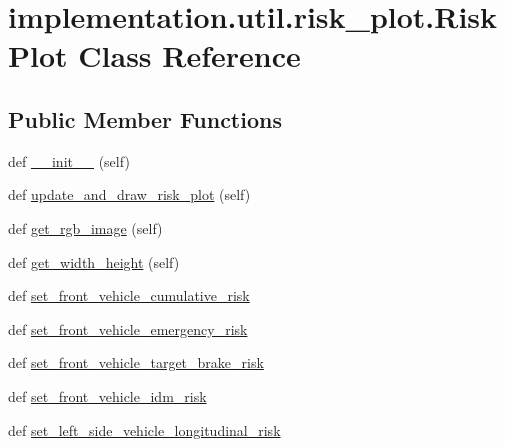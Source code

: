 \hypertarget{classimplementation_1_1util_1_1risk__plot_1_1_risk_plot}{}\section{implementation.\+util.\+risk\+\_\+plot.\+Risk\+Plot Class Reference}
\label{classimplementation_1_1util_1_1risk__plot_1_1_risk_plot}
\subsection*{Public Member Functions}
\begin{DoxyCompactItemize}
\item 
def \hyperlink{classimplementation_1_1util_1_1risk__plot_1_1_risk_plot_a574b3dc33ab0b1859a5167eed072a321}{\+\_\+\+\_\+init\+\_\+\+\_\+} (self)
\item 
def \hyperlink{classimplementation_1_1util_1_1risk__plot_1_1_risk_plot_aea7addcd83af1bfe853a79490b834f02}{update\+\_\+and\+\_\+draw\+\_\+risk\+\_\+plot} (self)
\item 
def \hyperlink{classimplementation_1_1util_1_1risk__plot_1_1_risk_plot_a7055e0167a4c656e1b76a1363c1941af}{get\+\_\+rgb\+\_\+image} (self)
\item 
def \hyperlink{classimplementation_1_1util_1_1risk__plot_1_1_risk_plot_a10abb3130925f46b34d1cdb5cf3daf72}{get\+\_\+width\+\_\+height} (self)
\item 
def \hyperlink{classimplementation_1_1util_1_1risk__plot_1_1_risk_plot_ae1c12efeca8a144da4c4c67bcee20a42}{set\+\_\+front\+\_\+vehicle\+\_\+cumulative\+\_\+risk}
\item 
def \hyperlink{classimplementation_1_1util_1_1risk__plot_1_1_risk_plot_afff8dae32aa6e615595db6168671c167}{set\+\_\+front\+\_\+vehicle\+\_\+emergency\+\_\+risk}
\item 
def \hyperlink{classimplementation_1_1util_1_1risk__plot_1_1_risk_plot_a3ec57dafb9fc0f298105bd6170a6bd41}{set\+\_\+front\+\_\+vehicle\+\_\+target\+\_\+brake\+\_\+risk}
\item 
def \hyperlink{classimplementation_1_1util_1_1risk__plot_1_1_risk_plot_a4a13fbf2134f7ac6e093fd13f22db9cf}{set\+\_\+front\+\_\+vehicle\+\_\+idm\+\_\+risk}
\item 
def \hyperlink{classimplementation_1_1util_1_1risk__plot_1_1_risk_plot_a25770f1dbc983398d3a10350ba9d78e2}{set\+\_\+left\+\_\+side\+\_\+vehicle\+\_\+longitudinal\+\_\+risk}
\item 

\end{DoxyCompactItemize}
